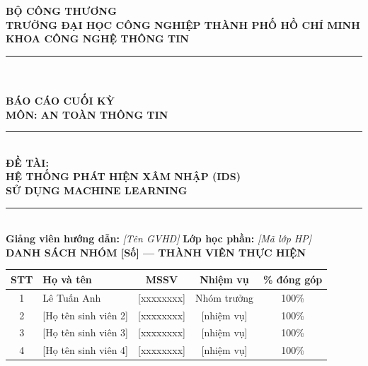 \begin{titlepage}
\thispagestyle{empty}
\begin{center}

{\fontsize{12pt}{14pt}\selectfont \textbf{BỘ CÔNG THƯƠNG}}\\[1pt]
{\fontsize{13pt}{15pt}\selectfont \textbf{TRƯỜNG ĐẠI HỌC CÔNG NGHIỆP THÀNH PHỐ HỒ CHÍ MINH}}\\[1pt]
{\fontsize{12pt}{14pt}\selectfont \textbf{KHOA CÔNG NGHỆ THÔNG TIN}}\\[2pt]
\rule{4.5cm}{0.7pt}\\[8pt]

\fbox{\parbox[c][2.4cm][c]{2.4cm}{\centering\footnotesize\textit{[LOGO]}}}\\[10pt]

{\fontsize{18pt}{20pt}\selectfont \textbf{BÁO CÁO CUỐI KỲ}}\\[3pt]
{\fontsize{14pt}{16pt}\selectfont \textbf{MÔN: AN TOÀN THÔNG TIN}}\\[14pt]

\rule{11.5cm}{0.8pt}\\[6pt]
{\fontsize{13pt}{15pt}\selectfont \textbf{ĐỀ TÀI:}}\\[3pt]
{\fontsize{15pt}{18pt}\selectfont \textbf{HỆ THỐNG PHÁT HIỆN XÂM NHẬP (IDS)\\
SỬ DỤNG MACHINE LEARNING}}\\[3pt]
\rule{11.5cm}{0.8pt}\\[12pt]

{\fontsize{12pt}{14pt}\selectfont
\textbf{Giảng viên hướng dẫn:} \textit{[Tên GVHD]} \hspace{0.8cm}
\textbf{Lớp học phần:} \textit{[Mã lớp HP]}}\\[10pt]

{\fontsize{12pt}{14pt}\selectfont \textbf{DANH SÁCH NHÓM [Số] — THÀNH VIÊN THỰC HIỆN}}\\[3pt]
\renewcommand{\arraystretch}{1.15}
{\fontsize{11pt}{13pt}\selectfont
\begin{tabular}{|c|l|c|c|c|}
\hline
\textbf{STT} & \textbf{Họ và tên} & \textbf{MSSV} & \textbf{Nhiệm vụ} & \textbf{\% đóng góp} \\ \hline
1 & Lê Tuấn Anh          & [xxxxxxxx] & Nhóm trưởng & 100\% \\ \hline
2 & [Họ tên sinh viên 2] & [xxxxxxxx] & [nhiệm vụ]  & 100\% \\ \hline
3 & [Họ tên sinh viên 3] & [xxxxxxxx] & [nhiệm vụ]  & 100\% \\ \hline
4 & [Họ tên sinh viên 4] & [xxxxxxxx] & [nhiệm vụ]  & 100\% \\ \hline
\end{tabular}}\\[12pt]


\end{center}
\end{titlepage}
